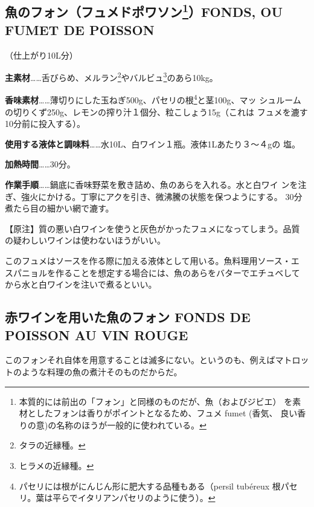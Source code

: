 \documentclass[twoside,12Q,b5paper]{escoffierltjsbook}
\newenvironment{recette}{\begin{multicols}{2}}{\end{multicols}}
\begin{document}
\begin{recette}
\subsection[魚のフォン（フュメドポワソン）FONDS, OU FUMET DE
POISSON]{\texorpdfstring{魚のフォン（フュメドポワソン\footnote{本質的には前出の「フォン」と同様のものだが、魚（およびジビエ）
  を素材としたフォンは香りがポイントとなるため、フュメ fumet (香気、
  良い香りの意)の名称のほうが一般的に使われている。}）FONDS, OU FUMET DE
POISSON}{魚のフォン（フュメドポワソン）FONDS, OU FUMET DE POISSON}}\label{ux9b5aux306eux30d5ux30a9ux30f3ux30d5ux30e5ux30e1ux30c9ux30ddux30efux30bdux30f313fonds-ou-fumet-de-poisson}

（仕上がり10L分）

\textbf{主素材}\ldots{}\ldots{}舌びらめ、メルラン\footnote{タラの近縁種。}やバルビュ\footnote{ヒラメの近縁種。}のあら10kg。

\textbf{香味素材}\ldots{}\ldots{}薄切りにした玉ねぎ500g、パセリの根\footnote{パセリには根がにんじん形に肥大する品種もある（persil
  tubéreux 根パセリ。葉は平らでイタリアンパセリのように使う）。}と茎100g、マッ
シュルームの切りくず250g、レモンの搾り汁１個分、粒こしょう15g（これは
フュメを漉す10分前に投入する）。

\textbf{使用する液体と調味料}\ldots{}\ldots{}水10L、白ワイン１瓶。液体1Lあたり３〜４gの
塩。

\textbf{加熱時間}\ldots{}\ldots{}30分。

\textbf{作業手順}\ldots{}\ldots{}鍋底に香味野菜を敷き詰め、魚のあらを入れる。水と白ワイ
ンを注ぎ、強火にかける。丁寧にアクを引き、微沸騰の状態を保つようにする。
30分煮たら目の細かい網で漉す。

【原注】質の悪い白ワインを使うと灰色がかったフュメになってしまう。品質
の疑わしいワインは使わないほうがいい。

このフュメはソースを作る際に加える液体として用いる。魚料理用ソース・エ
スパニョルを作ることを想定する場合には、魚のあらをバターでエチュベして
から水と白ワインを注いで煮るといい。

\subsection{赤ワインを用いた魚のフォン FONDS DE POISSON AU VIN
ROUGE}\label{ux8d64ux30efux30a4ux30f3ux3092ux7528ux3044ux305fux9b5aux306eux30d5ux30a9ux30f3-fonds-de-poisson-au-vin-rouge}

このフォンそれ自体を用意することは滅多にない。というのも、例えばマトロッ
トのような料理の魚の煮汁そのものだからだ。


\end{recette}
\end{document}

